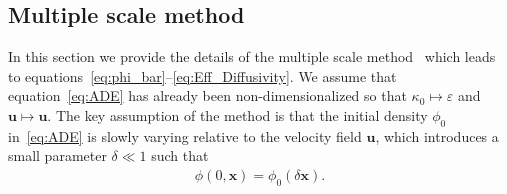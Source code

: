 \documentclass[leqno,onefignum,onetabnum]{siamltex1213}
\newcommand{\vecx}{\boldsymbol{x}}
\newcommand{\vecu}{\boldsymbol{u}}
\begin{document}
\newpage
\subsection{Multiple scale method}\label{sec:Multiscal_Method}
%
In this section we provide the details of the multiple scale
method~\cite{McLaughlin:SIAM_JAM:780,Papanicolaou:1981:36:8,Papanicolaou:RF-835,Bensoussan:Book:1978} 
which leads to
equations~\eqref{eq:phi_bar}--\eqref{eq:Eff_Diffusivity}. We assume
that 
equation~\eqref{eq:ADE} has already been non-dimensionalized so that
$\kappa_0\mapsto\varepsilon$ and $\vecu \mapsto\vecu $. The key assumption of the method is
that the initial density $\phi_0$ in~\eqref{eq:ADE} is slowly
varying relative to the velocity field $\vecu $, which introduces a
small parameter $\delta\ll1$ such that  
% 
\begin{align}\label{eq:IC} 
  \phi(0,\vecx)=\phi_0(\delta\vecx).
\end{align}
%
\end{document}
